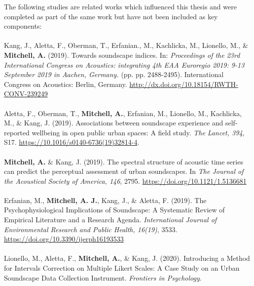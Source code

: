 \documentclass[oneside,fontsize=11pt,titlepage,chapterprefix=true
]{scrbook}
\begin{document}

\newpage
The following studies are related works which influenced this thesis and were completed as part of the same work but have not been included as key components:

\paragraph*{}
Kang, J., Aletta, F., Oberman, T., Erfanian., M., Kachlicka, M., Lionello, M., \& \textbf{Mitchell, A.} (2019). Towards soundscape indices. In: \emph{Proceedings of the 23rd International Congress on Acoustics: integrating 4th EAA Euroregio 2019: 9-13 September 2019 in Aachen, Germany.} (pp. pp. 2488-2495). International Congress on Acoustics: Berlin, Germany. \url{http://dx.doi.org/10.18154/RWTH-CONV-239249}

\paragraph*{}
Aletta, F., Oberman, T., \textbf{Mitchell, A.}, Erfanian, M., Lionello, M., Kachlicka, M., \& Kang, J. (2019). Associations between soundscape experience and self-reported wellbeing in open public urban spaces: A field study. \emph{The Lancet, 394}, S17. \url{https://10.1016/s0140-6736(19)32814-4}.

\paragraph*{}
\textbf{Mitchell, A.} \& Kang, J. (2019). The spectral structure of acoustic time series can predict the perceptual assessment of urban soundscapes. In \emph{The Journal of the Acoustical Society of America, 146}, 2795. \url{https://doi.org/10.1121/1.5136681}

\paragraph*{}
Erfanian, M., \textbf{Mitchell, A. J.}, Kang, J., \& Aletta, F. (2019). The Psychophysiological Implications of Soundscape: A Systematic Review of Empirical Literature and a Research Agenda. \emph{International Journal of Environmental Research and Public Health, 16(19)}, 3533. \url{https://doi.org/10.3390/ijerph16193533}

\paragraph*{}
Lionello, M., Aletta, F., \textbf{Mitchell, A.}, \& Kang, J. (2020). Introducing a Method for Intervals Correction on Multiple Likert Scales: A Case Study on an Urban Soundscape Data Collection Instrument. \emph{Frontiers in Psychology}.
\end{document}
